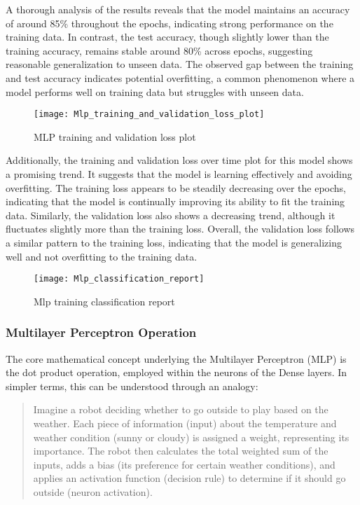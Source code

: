 \documentclass[
	article, %
	11pt, %
	draft, %
]{CSUniSchoolLabReport}
\begin{document}
A thorough analysis of the results reveals that the model maintains an accuracy of around 85\% throughout the epochs, indicating strong performance on the training data. In contrast, the test accuracy, though slightly lower than the training accuracy, remains stable around 80\% across epochs, suggesting reasonable generalization to unseen data. The observed gap between the training and test accuracy indicates potential overfitting, a common phenomenon where a model performs well on training data but struggles with unseen data.

\begin{figure}[H] 
	\centering
	\texttt{[image: Mlp\_training\_and\_validation\_loss\_plot]}
	\caption{MLP training and validation loss plot}\label{fig:mlp_training_and_validation_loss_plot}
\end{figure}

Additionally, the training and validation loss over time plot for this model shows a promising trend. It suggests that the model is learning effectively and avoiding overfitting. The training loss appears to be steadily decreasing over the epochs, indicating that the model is continually improving its ability to fit the training data. Similarly, the validation loss also shows a decreasing trend, although it fluctuates slightly more than the training loss. Overall, the validation loss follows a similar pattern to the training loss, indicating that the model is generalizing well and not overfitting to the training data.

\begin{figure}[H] 
	\centering
	\texttt{[image: Mlp\_classification\_report]}
	\caption{Mlp training classification report}\label{fig:mlp_classification_report}
\end{figure}


\subsubsection{Multilayer Perceptron Operation}

The core mathematical concept underlying the Multilayer Perceptron (MLP) is the dot product operation, employed within the neurons of the Dense layers. In simpler terms, this can be understood through an analogy:

\begin{quote}
Imagine a robot deciding whether to go outside to play based on the weather. Each piece of information (input) about the temperature and weather condition (sunny or cloudy) is assigned a weight, representing its importance. The robot then calculates the total weighted sum of the inputs, adds a bias (its preference for certain weather conditions), and applies an activation function (decision rule) to determine if it should go outside (neuron activation).
\end{quote}
\end{document}
